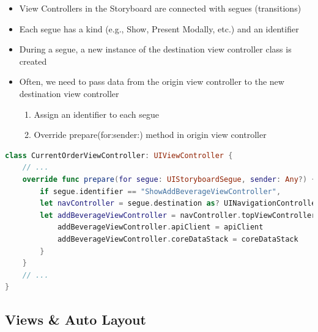 \begin{breakbox}

\begin{itemize}
\tightlist
\item
  View Controllers in the Storyboard are connected with segues
  (transitions)
\item
  Each segue has a kind (e.g., Show, Present Modally, etc.) and an
  identifier
\item
  During a segue, a new instance of the destination view controller
  class is created
\item
  Often, we need to pass data from the origin view controller to the new
  destination view controller

  \begin{enumerate}
  \def\labelenumi{\arabic{enumi}.}
  \tightlist
  \item
    Assign an identifier to each segue
  \item
    Override prepare(for:sender:) method in origin view controller
  \end{enumerate}
\end{itemize}

\begin{lstlisting}[language=swift]
class CurrentOrderViewController: UIViewController {
    // ...
    override func prepare(for segue: UIStoryboardSegue, sender: Any?) {
        if segue.identifier == "ShowAddBeverageViewController",
        let navController = segue.destination as? UINavigationController,
        let addBeverageViewController = navController.topViewController as? AddBeverageViewController {
            addBeverageViewController.apiClient = apiClient
            addBeverageViewController.coreDataStack = coreDataStack
        }
    }
    // ...
}
\end{lstlisting}
\end{breakbox}


\subsection{Views \& Auto Layout}

